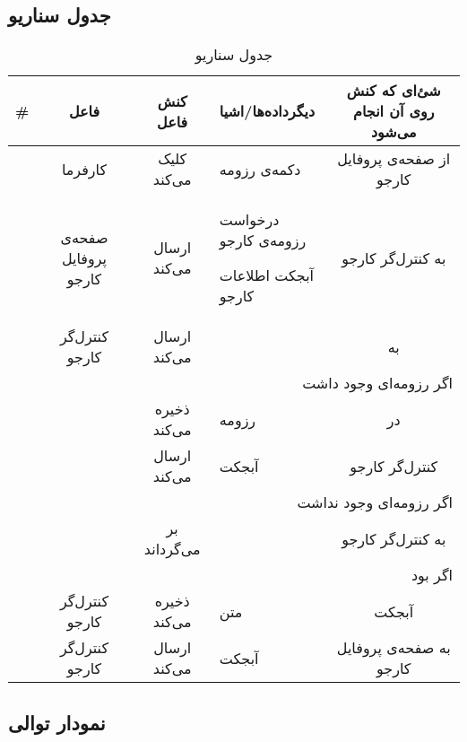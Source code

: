 \subsection{جدول سناریو}
\begin{table}[H]
	\caption{جدول سناریو }
	\begin{adjustbox}{width=\textwidth}
		\begin{tabular}{|c|c|c|p{}|c|}
			\hline
			\# & فاعل & کنش فاعل & دیگرداده‌ها/اشیا & شئ‌ای که کنش روی آن انجام می‌شود \\
			\hline
			\hline
			\sstep & 
			کارفرما &
			کلیک می‌کند &
			دکمه‌ی رزومه &
			از صفحه‌ی پروفایل کارجو \\
			\hline
			\sstep & 
			صفحه‌ی پروفایل کارجو &
			ارسال می‌کند &
			\begin{inparaitem}
				\item درخواست رزومه‌ی کارجو
				\item آبجکت \json اطلاعات کارجو
			\end{inparaitem} &
			به کنترل‌گر کارجو \\
			\hline
			\sstep & 
			کنترل‌گر کارجو &
			ارسال می‌کند &
			\json &
			به \gdm \\
			\hline
			\sstep & \multicolumn{4}{|r|}{اگر رزومه‌ای وجود داشت} \\
			\hline
			\sstep & 
			\gdm &
			ذخیره می‌کند &
			رزومه &
			در \json\\
			\hline
			\sstep & 
			\gdm &
			ارسال می‌کند &
			آبجکت \json &
			کنترل‌گر کارجو \\
			\hline
			\sstep & \multicolumn{4}{|r|}{اگر رزومه‌ای وجود نداشت}\\
			\hline
			\sstep & 
			\gdm&
			بر می‌گرداند &
			\none&
			به کنترل‌گر کارجو \\
			\hline
			\sstep & \multicolumn{4}{|r|}{اگر \none بود} \\
			\hline
			\sstep & 
			کنترل‌گر کارجو &
			ذخیره می‌کند &
			متن \say{عدم وجود رزومه}&
			آبجکت \json\\
			\hline
			\sstep & 
			کنترل‌گر کارجو &
			ارسال می‌کند &
			آبجکت \json &
			به صفحه‌ی پروفایل کارجو \\
			\hline
		\end{tabular}
	\end{adjustbox}
\end{table}
\setcounter{MainStepCounter}{0}
\setcounter{SenarioCounter}{0}
\subsection{نمودار توالی}

